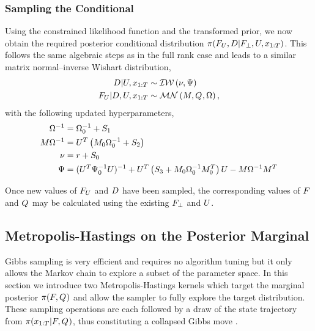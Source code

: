 \documentclass[journal,10pt]{IEEEtran}
\begin{document}
\subsubsection{Sampling the Conditional}
Using the constrained likelihood function and the transformed prior, we now obtain the required posterior conditional distribution $\pi(F_U,D|F_{\perp},U,x_{1:T})$. This follows the same algebraic steps as in the full rank case and leads to a similar matrix normal--inverse Wishart distribution,
%
\begin{align}
 D | U, x_{1:T} &\sim \mathcal{IW}\left(\nu,\Psi\right) \\
 F_U | D, U, x_{1:T} &\sim \mathcal{MN}\left(M,Q_{},\Omega\right)     ,
\end{align}
%
with the following updated hyperparameters,
%
\begin{align}
 \Omega^{-1}                 &= \Omega_0^{-1} + S_{1} \\
 M \Omega^{-1} &= U^{T}\left( M_0 \Omega_0^{-1} + S_{2} \right) \\
 \nu                                &= r + S_{0} \\
 \Psi                        &= (U^{T}\Psi_0^{-1}U)^{-1} + U^{T}\left( S_{3} + M_0 \Omega_0^{-1} M_0^{T} \right)U - M \Omega^{-1} M^{T}
\end{align}

Once new values of $F_U$ and $D$ have been sampled, the corresponding values of $F_{}$ and $Q_{}$ may be calculated using the existing $F_{\perp}$ and $U$.


\subsection{Metropolis-Hastings on the Posterior Marginal}

Gibbs sampling is very efficient and requires no algorithm tuning but it only allows the Markov chain to explore a subset of the parameter space. In this section we introduce two Metropolis-Hastings kernels which target the marginal posterior $\pi(F_{},Q_{})$ and allow the sampler to fully explore the target distribution. These sampling operations are each followed by a draw of the state trajectory from $\pi(x_{1:T}|F_{},Q_{})$, thus constituting a collapsed Gibbs move \cite{Dyk2008}.
\end{document}
